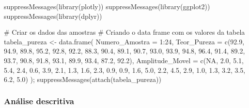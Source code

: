 \documentclass[
  letterpaper,
  DIV=11,
  numbers=noendperiod]{scrartcl}
\newenvironment{Shaded}{\begin{snugshade}}{\end{snugshade}}
\newcommand{\AttributeTok}[1]{\textcolor[rgb]{0.40,0.45,0.13}{#1}}
\newcommand{\CommentTok}[1]{\textcolor[rgb]{0.37,0.37,0.37}{#1}}
\newcommand{\ConstantTok}[1]{\textcolor[rgb]{0.56,0.35,0.01}{#1}}
\newcommand{\DecValTok}[1]{\textcolor[rgb]{0.68,0.00,0.00}{#1}}
\newcommand{\FloatTok}[1]{\textcolor[rgb]{0.68,0.00,0.00}{#1}}
\newcommand{\FunctionTok}[1]{\textcolor[rgb]{0.28,0.35,0.67}{#1}}
\newcommand{\NormalTok}[1]{\textcolor[rgb]{0.00,0.23,0.31}{#1}}
\newcommand{\OtherTok}[1]{\textcolor[rgb]{0.00,0.23,0.31}{#1}}
\newcommand{\SpecialCharTok}[1]{\textcolor[rgb]{0.37,0.37,0.37}{#1}}
\begin{document}
\begin{Shaded}
\begin{Highlighting}[]
\FunctionTok{suppressMessages}\NormalTok{(}\FunctionTok{library}\NormalTok{(plotly))}
\FunctionTok{suppressMessages}\NormalTok{(}\FunctionTok{library}\NormalTok{(ggplot2))}
\FunctionTok{suppressMessages}\NormalTok{(}\FunctionTok{library}\NormalTok{(dplyr))}

\CommentTok{\# Criar os dados das amostras}
 \CommentTok{\# Criando o data frame com os valores da tabela}
\NormalTok{tabela\_pureza }\OtherTok{\textless{}{-}} \FunctionTok{data.frame}\NormalTok{(}
  \AttributeTok{Numero\_Amostra =} \DecValTok{1}\SpecialCharTok{:}\DecValTok{24}\NormalTok{,}
  \AttributeTok{Teor\_Pureza =} \FunctionTok{c}\NormalTok{(}\FloatTok{92.9}\NormalTok{, }\FloatTok{94.9}\NormalTok{, }\FloatTok{89.8}\NormalTok{, }\FloatTok{95.2}\NormalTok{, }\FloatTok{92.8}\NormalTok{, }\FloatTok{92.2}\NormalTok{, }\FloatTok{88.3}\NormalTok{, }\FloatTok{90.4}\NormalTok{, }\FloatTok{89.1}\NormalTok{, }\FloatTok{90.7}\NormalTok{, }
                  \FloatTok{93.0}\NormalTok{, }\FloatTok{93.9}\NormalTok{, }\FloatTok{94.8}\NormalTok{, }\FloatTok{96.4}\NormalTok{, }\FloatTok{91.4}\NormalTok{, }\FloatTok{89.2}\NormalTok{, }\FloatTok{93.7}\NormalTok{, }\FloatTok{90.8}\NormalTok{, }\FloatTok{91.8}\NormalTok{, }\FloatTok{93.1}\NormalTok{, }
                  \FloatTok{89.9}\NormalTok{, }\FloatTok{93.4}\NormalTok{, }\FloatTok{87.2}\NormalTok{, }\FloatTok{92.2}\NormalTok{),}
  \AttributeTok{Amplitude\_Movel =} \FunctionTok{c}\NormalTok{(}\ConstantTok{NA}\NormalTok{, }\FloatTok{2.0}\NormalTok{, }\FloatTok{5.1}\NormalTok{, }\FloatTok{5.4}\NormalTok{, }\FloatTok{2.4}\NormalTok{, }\FloatTok{0.6}\NormalTok{, }\FloatTok{3.9}\NormalTok{, }\FloatTok{2.1}\NormalTok{, }\FloatTok{1.3}\NormalTok{, }\FloatTok{1.6}\NormalTok{, }
                      \FloatTok{2.3}\NormalTok{, }\FloatTok{0.9}\NormalTok{, }\FloatTok{0.9}\NormalTok{, }\FloatTok{1.6}\NormalTok{, }\FloatTok{5.0}\NormalTok{, }\FloatTok{2.2}\NormalTok{, }\FloatTok{4.5}\NormalTok{, }\FloatTok{2.9}\NormalTok{, }\FloatTok{1.0}\NormalTok{, }\FloatTok{1.3}\NormalTok{, }
                      \FloatTok{3.2}\NormalTok{, }\FloatTok{3.5}\NormalTok{, }\FloatTok{6.2}\NormalTok{, }\FloatTok{5.0}\NormalTok{)}
\NormalTok{); }\FunctionTok{suppressMessages}\NormalTok{(}\FunctionTok{attach}\NormalTok{(tabela\_pureza))}
\end{Highlighting}
\end{Shaded}

\subsubsection{Análise descritiva}\label{anuxe1lise-descritiva}
\end{document}
